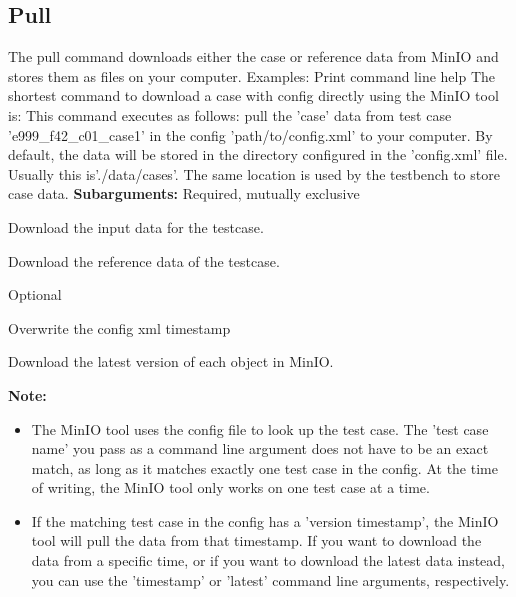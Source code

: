 \documentclass{deltares_memo}
\begin{document}
\subsection{Pull}
The pull command downloads either the case or reference data from MinIO and stores them as files on your computer. Examples:
\newline
Print command line help
\newline
{}
\newline
\newline
The shortest command to download a case with config directly using the MinIO tool is: 
\newline
This command executes as follows: pull the 'case' data from test case 'e999\_f42\_c01\_case1' in the config 'path/to/config.xml' to your computer. By default, the data will be stored in the directory configured in the 'config.xml' file. Usually this is'./data/cases'. The same location is used by the testbench to store case data.
\newpage
\textbf{Subarguments:}
\newline
Required, mutually exclusive
\begin{guilist}
	\item[\texttt{-{}-case}] Download the input data for the testcase.
	\item[\texttt{-{}-reference}] Download the reference data of the testcase.
\end{guilist}
Optional
\begin{guilist}
	\item[\texttt{-{}-timestamp -t}] Overwrite the config xml timestamp
	\item[\texttt{-{}-latest}] Download the latest version of each object in MinIO.
\end{guilist}
\textbf{Note:}
\begin{itemize}
	\item The MinIO tool uses the config file to look up the test case. The 'test case name' you pass as a command line argument does not have to be an exact match, as long as it matches exactly one test case in the config. At the time of writing, the MinIO tool only works on one test case at a time.
	\item If the matching test case in the config has a 'version timestamp', the MinIO tool will pull the data from that timestamp. If you want to download the data from a specific time, or if you want to download the latest data instead, you can use the 'timestamp' or 'latest' command line arguments, respectively.
\end{itemize}
\end{document}
